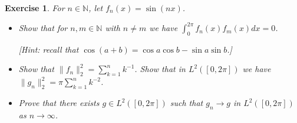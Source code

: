 \documentclass{article}
\newtheorem{exercise}[theorem]{Exercise}
\begin{document}
\begin{exercise}
For $n \in \mathbb{N}$, let $f_n(x) = \sin(n x)$.
\begin{itemize}
    \item[(a)] Show that for $n, m \in \mathbb{N}$ with $n \neq m$ we have $\int_0^{2\pi} f_n(x) f_m(x)dx = 0$.
    
    \textit{[Hint: recall that $\cos(a + b) = \cos a \cos b - \sin a \sin b$.]}
    
    \item[(b)] Show that $\|f_n\|_2^2 = \sum_{k=1}^{n} k^{-1}$. Show that in $L^2([0,2\pi])$ we have $\|g_n\|_2^2 = \pi \sum_{k=1}^{n} k^{-2}$.
    
    \item[(c)] Prove that there exists $g \in L^2([0,2\pi])$ such that $g_n \to g$ in $L^2([0,2\pi])$ as $n \to \infty$.
\end{itemize}
\end{exercise}
\end{document}
